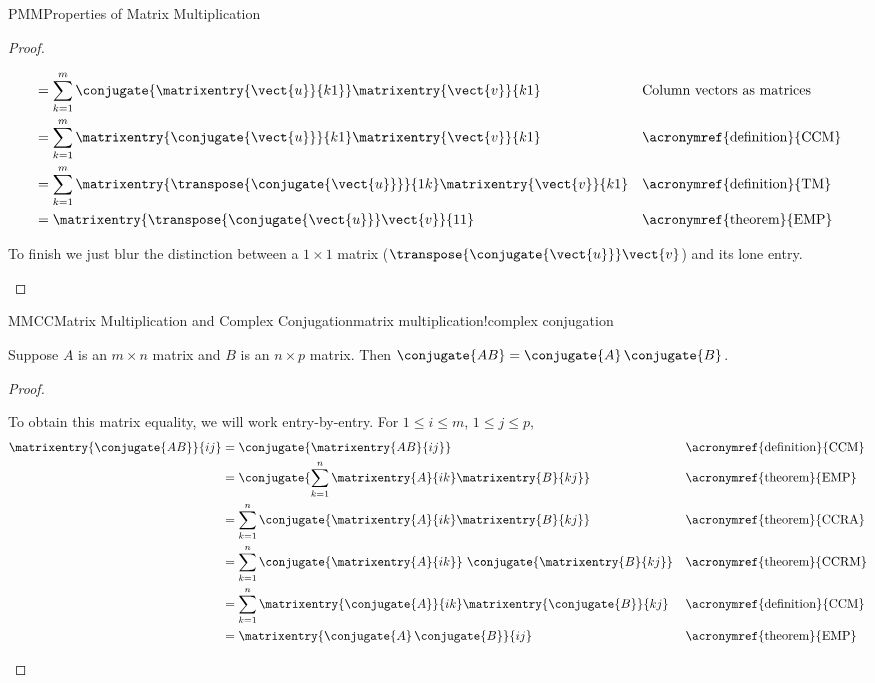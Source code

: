 \begin{subsect}{PMM}{Properties of Matrix Multiplication}
\begin{proof}
\begin{para}
\begin{align*}
%
&=\sum_{k=1}^{m}\conjugate{\matrixentry{\vect{u}}{k1}}\matrixentry{\vect{v}}{k1}
&&\text{Column vectors as matrices}\\
%
&=\sum_{k=1}^{m}\matrixentry{\conjugate{\vect{u}}}{k1}\matrixentry{\vect{v}}{k1}
&&\text{\acronymref{definition}{CCM}}\\
%
&=\sum_{k=1}^{m}\matrixentry{\transpose{\conjugate{\vect{u}}}}{1k}\matrixentry{\vect{v}}{k1}
&&\text{\acronymref{definition}{TM}}\\
%
&=\matrixentry{\transpose{\conjugate{\vect{u}}}\vect{v}}{11}
&&\text{\acronymref{theorem}{EMP}}\\
\end{align*}
\end{para}
%
\begin{para}To finish we just blur the distinction between a $1\times 1$ matrix ($\transpose{\conjugate{\vect{u}}}\vect{v}$) and its lone entry.\end{para}
%
\end{proof}
%
\begin{theorem}{MMCC}{Matrix Multiplication and Complex Conjugation}{matrix multiplication!complex conjugation}
\begin{para}Suppose $A$ is an $m\times n$ matrix and $B$ is an $n\times p$ matrix.  Then $\conjugate{AB}=\conjugate{A}\,\conjugate{B}$.\end{para}
\end{theorem}
%
\begin{proof}
%
\begin{para}To obtain this matrix equality, we will work entry-by-entry.  For $1\leq i\leq m$, $1\leq j\leq p$,
%
\begin{align*}
\matrixentry{\conjugate{AB}}{ij}
%
&=\conjugate{\matrixentry{AB}{ij}}
&&\text{\acronymref{definition}{CCM}}\\
%
&=\conjugate{\sum_{k=1}^{n}\matrixentry{A}{ik}\matrixentry{B}{kj}}
&&\text{\acronymref{theorem}{EMP}}\\
%
&=\sum_{k=1}^{n}\conjugate{\matrixentry{A}{ik}\matrixentry{B}{kj}}
&&\text{\acronymref{theorem}{CCRA}}\\
%
&=\sum_{k=1}^{n}\conjugate{\matrixentry{A}{ik}}\,\,\conjugate{\matrixentry{B}{kj}}
&&\text{\acronymref{theorem}{CCRM}}\\
%
&=\sum_{k=1}^{n}\matrixentry{\conjugate{A}}{ik}\matrixentry{\conjugate{B}}{kj}
&&\text{\acronymref{definition}{CCM}}\\
%
&=\matrixentry{\conjugate{A}\,\conjugate{B}}{ij}
&&\text{\acronymref{theorem}{EMP}}
%
\end{align*}

\end{para}
\end{proof}
\end{subsect}
